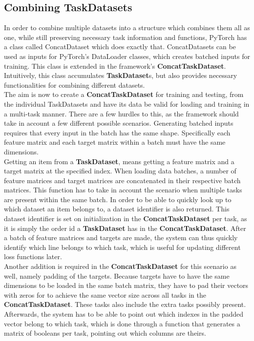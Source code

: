 \subsection{Combining TaskDatasets} \label{Impl:DataLoad:Combining}

In order to combine multiple datasets into a structure which combines them all as one, while still preserving necessary task information and functions, PyTorch has a class called ConcatDataset which does exactly that. ConcatDatasets can be used as inputs for PyTorch's DataLoader classes, which creates batched inputs for training. This class is extended in the framework's \textbf{ConcatTaskDataset}. Intuitively, this class accumulates \textbf{TaskDataset}s, but also provides necessary functionalities for combining different datasets. \\

The aim is now to create a \textbf{ConcatTaskDataset} for training and testing, from the individual TaskDatasets and have its data be valid for loading and training in a multi-task manner. There are a few hurdles to this, as the framework should take in account a few different possible scenarios. Generating batched inputs requires that every input in the batch has the same shape. Specifically each feature matrix and each target matrix within a batch must have the same dimensions. \\

Getting an item from a \textbf{TaskDataset}, means getting a feature matrix and a target matrix at the specified index. When loading data batches, a number of feature matrices and target matrices are concatenated in their respective batch matrices. This function has to take in account the scenario when multiple tasks are present within the same batch. In order to be able to quickly look up to which dataset an item belongs to, a dataset identifier is also returned. This dataset identifier is set on initialization in the \textbf{ConcatTaskDataset} per task, as it is simply the order id a \textbf{TaskDataset} has in the \textbf{ConcatTaskDataset}. After a batch of feature matrices and targets are made, the system can thus quickly identify which line belongs to which task, which is useful for updating different loss functions later. \\

Another addition is required in the \textbf{ConcatTaskDataset} for this scenario as well, namely padding of the targets. Because targets have to have the same dimensions to be loaded in the same batch matrix, they have to pad their vectors with zeros for to achieve the same vector size across all tasks in the \textbf{ConcatTaskDataset}. These tasks also include the extra tasks possibly present. Afterwards, the system has to be able to point out which indexes in the padded vector belong to which task, which is done through a function that generates a matrix of booleans per task, pointing out which columns are theirs. \\

